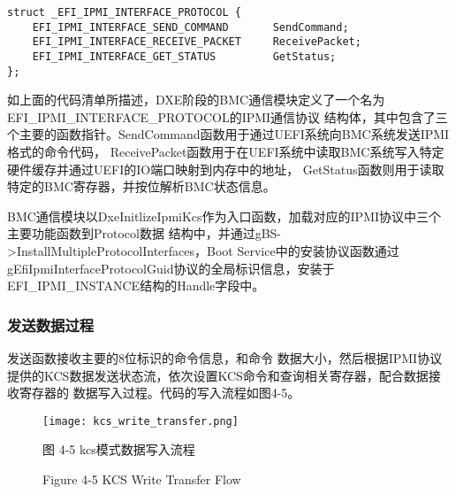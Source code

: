 \begin{lstlisting}
struct _EFI_IPMI_INTERFACE_PROTOCOL {
    EFI_IPMI_INTERFACE_SEND_COMMAND       SendCommand;
    EFI_IPMI_INTERFACE_RECEIVE_PACKET     ReceivePacket;
    EFI_IPMI_INTERFACE_GET_STATUS         GetStatus;
};
\end{lstlisting}
如上面的代码清单所描述，DXE阶段的BMC通信模块定义了一个名为EFI\_IPMI\_INTERFACE\_PROTOCOL的IPMI通信协议
结构体，其中包含了三个主要的函数指针。SendCommand函数用于通过UEFI系统向BMC系统发送IPMI格式的命令代码，
ReceivePacket函数用于在UEFI系统中读取BMC系统写入特定硬件缓存并通过UEFI的IO端口映射到内存中的地址，
GetStatus函数则用于读取特定的BMC寄存器，并按位解析BMC状态信息\cite{addition7}。
\par BMC通信模块以DxeInitlizeIpmiKcs作为入口函数，加载对应的IPMI协议中三个主要功能函数到Protocol数据
结构中，并通过gBS->InstallMultipleProtocolInterfaces，Boot Service中的安装协议函数通过
gEfiIpmiInterfaceProtocolGuid协议的全局标识信息，安装于EFI\_IPMI\_INSTANCE结构的Handle字段中。

\subsubsection{发送数据过程}
发送函数接收主要的8位标识的命令信息，和命令
数据大小，然后根据IPMI协议提供的KCS数据发送状态流，依次设置KCS命令和查询相关寄存器，配合数据接收寄存器的
数据写入过程\cite{english22}。代码的写入流程如图4-5。

\begin{figure}[htb]
    \vspace{0cm}   
    \setlength{\abovecaptionskip}{0.3cm}
	\centering
    \texttt{[image: kcs\_write\_transfer.png]}
    \caption*{图 4-5 kcs模式数据写入流程}
    \setlength{\belowcaptionskip}{-0.7cm}
    \caption*{Figure 4-5 KCS Write Transfer Flow}
\end{figure}

